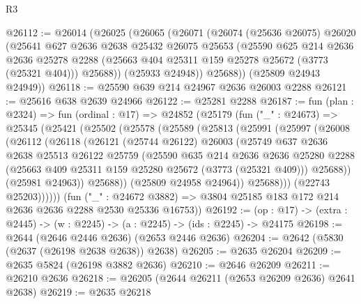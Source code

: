 \begin{lexlean}{R3}
\begin{coremodule}
@26112 := @26014
    (@26025
      (@26065
        (@26071
          (@26074
            (@25636 @26075)
            @26020
            (@25641
              @627
              @2636
              @2638
              @25432
              @26075
              @25653
              (@25590
                @625
                @214
                @2636
                @2636
                @25278
                @2288
                (@25663 @404 @25311 @159 @25278 @25672 (@3773 (@25321 @404)))
                @25688))
            (@25933 @24948))
          @25688))
      (@25809 @24943 @24949))
@26118 := @25590 @639 @214 @24967 @2636 @26003 @2288
@26121 := @25616 @638 @2639 @24966
@26122 := @25281 @2288
@26187 := fun (plan : @2324) =>
  fun (ordinal : @17) =>
  @24852
    (@25179
      (fun ("_" : @24673) =>
      @25345
        (@25421
          (@25502
            (@25578
              (@25589
                (@25813
                  (@25991
                    (@25997
                      (@26008
                        (@26112
                          (@26118
                            (@26121
                              (@25744 @26122)
                              @26003
                              (@25749
                                @637
                                @2636
                                @2638
                                @25513
                                @26122
                                @25759
                                (@25590
                                  @635
                                  @214
                                  @2636
                                  @2636
                                  @25280
                                  @2288
                                  (@25663 @409 @25311 @159 @25280 @25672 (@3773 (@25321 @409)))
                                  @25688))
                              (@25981 @24963))
                            @25688))
                        (@25809 @24958 @24964))
                      @25688)))
                (@22743 @25203))))))
      (fun ("_" : @24672 @3882) =>
      @3804 @25185 @183 @172 @214 @2636 @2636 @2288 @2530 @25336 @16753))
@26192 := (op : @17) -> (extra : @2445) -> (w : @2245) -> (a : @2245) -> (ids : @2245) -> @24175
@26198 := @2644 (@2646 @2446 @2636) (@2653 @2446 @2636)
@26204 := @2642 (@5830 (@2637 (@26198 @2638 @2638)) @2638)
@26205 := @2635 @26204
@26209 := @2635 @5824 (@26198 @3882 @2636)
@26210 := @2646 @26209
@26211 := @26210 @2636
@26218 := @26205 (@2644 @26211 (@2653 @26209 @2636) @2641 @2638)
@26219 := @2635 @26218

\end{coremodule}
\end{lexlean}
